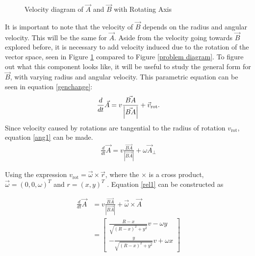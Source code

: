 \documentclass[pstricks, border=12pt]{article}
\begin{document}
\begin{figure}[tbh]
        \centering
        
        \caption{Velocity diagram of $\vec A$ and $\vec B$ with Rotating Axis}
        \label{Rot1a}
\end{figure}

It is important to note that the velocity of $\vec B$ depends on the radius and angular velocity. This will be the same for $\vec A$. Aside from the velocity going towards $\vec B$ explored before, it is necessary to add velocity induced due to the rotation of the vector space, seen in Figure \ref{Rot1a} compared to Figure \ref{problem diagram}.  To figure out what this component looks like, it will be useful to study the general form for $\vec B$, with varying radius and angular velocity. This parametric equation can be seen in equation \eqref{genchange}:
\begin{equation}
    \centering
        \frac{d}{dt}\Vec{A} = v\frac{\Vec{BA}}{\left|\Vec{BA}\right|} + \vec v_{\text{rot}}.
        \label{genchange}
\end{equation}
Since velocity caused by rotations are tangential to the radius of rotation $v_{\text{rot}}$, equation \ref{ang1} can be made.
\begin{equation}
    \begin{split}
        \frac{d}{dt}\Vec{A} = v\frac{\Vec{BA}}{\left|\Vec{BA}\right|} + \omega \vec A_{\perp}
    \end{split}
    \label{ang1}
\end{equation}

Using the expression $v_{\text{rot}} = \vec\omega\times\vec r$, where the $\times$ is a cross product, $\vec\omega = (0, 0, \omega)^T$ and $r = (x, y)^T$ \cite{hamm_2020, kundu_tritton}. Equation \eqref{rel1} can be constructed as

 \begin{equation}
 \begin{split}
     \frac{d}{dt}\Vec{A} &= v\frac{\Vec{BA}}{\left|\Vec{BA}\right|} + \vec\omega\times\Vec{A}\\
     &=
      \begin{bmatrix}
      \frac{R-x}{\sqrt{(R-x)^2+y^2}}v - \omega y\\
       -\frac{y}{\sqrt{(R-x)^2+y^2}}v + \omega x
       \end{bmatrix}
       \end{split}
     \label{rel1}
 \end{equation}
\end{document}
